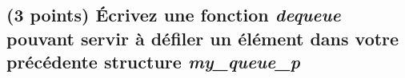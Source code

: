 \documentclass[11pt,a4paper]{article}
\begin{document}
\bigskip

\begin{center}

\end{center}

\newpage

\subsection{(3 points) \'Ecrivez une fonction \og \textit{dequeue} \fg{} pouvant servir à défiler un élément dans votre précédente structure \og \textit{my\_queue\_p} \fg{} }

\bigskip

\begin{center}
\end{center}

\bigskip
\end{document}
